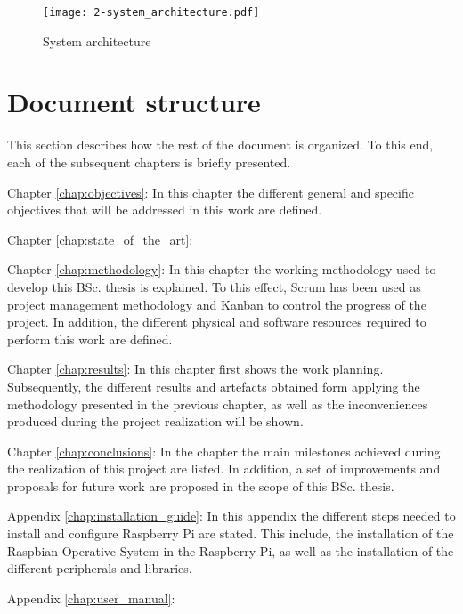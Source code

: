 \begin{figure}[!h]
	\begin{center}
		\texttt{[image: 2-system\_architecture.pdf]}	
		\caption{System architecture}
		\label{fig:2-system_architecture}
	\end{center}
\end{figure}




\section{Document structure}

This section describes how the rest of the document is organized. To this end, each of the subsequent chapters is briefly presented.

\begin{definitionlist}
	\item[Chapter \ref{chap:objectives}: \nameref{chap:objectives}] In this chapter the different general and specific objectives that will be addressed in this work are defined.
	
	\item[Chapter \ref{chap:state_of_the_art}: \nameref{chap:state_of_the_art}] 
	
	\item[Chapter \ref{chap:methodology}: \nameref{chap:methodology}] In this chapter the working methodology used to develop this \ac{BSc.} thesis is explained. To this effect, Scrum has been used as project management methodology and Kanban to control the progress of the project. In addition, the different physical and software resources required to perform this work are defined.
	
	\item[Chapter \ref{chap:results}: \nameref{chap:results}] In this chapter first shows the work planning. Subsequently, the different results and artefacts obtained form applying the methodology presented in the previous chapter, as well as the inconveniences produced during the project realization will be shown. 
	
	\item[Chapter \ref{chap:conclusions}: \nameref{chap:conclusions}] In the chapter the main milestones achieved during the realization of this project are listed. In addition, a set of improvements and proposals for future work are proposed in the scope of this \ac{BSc.} thesis. 
	
	\item[Appendix \ref{chap:installation_guide}: \nameref{chap:installation_guide}] In this appendix the different steps needed to install and configure Raspberry Pi are stated. This include, the installation of the Raspbian Operative System in the Raspberry Pi, as well as the installation of the different peripherals and libraries.
	
	\item[Appendix \ref{chap:user_manual}: \nameref{chap:user_manual}] 
\end{definitionlist}